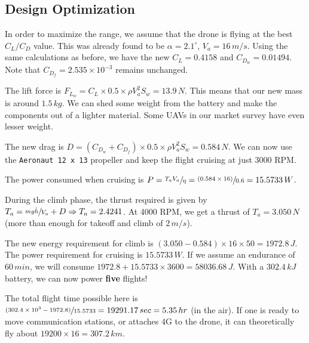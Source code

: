 \subsection{Design Optimization}

In order to maximize the range, we assume that the drone is flying at the best $C_L/C_D$ value. This was already found to be $\alpha=2.1^\circ$, $V_a = 16\,m/s$. Using the same calculations as before, we have the new $C_L = 0.4158$ and $C_{D_w} = 0.01494$. Note that $C_{D_f} = 2.535 \times 10^{-3}$ remains unchanged.

The lift force is $F_{L_w} = C_L \times 0.5 \times \rho V_a^2 S_w = 13.9\,N$. This means that our new mass is around $1.5\,kg$. We can shed some weight from the battery and make the components out of a lighter material. Some UAVs in our market survey have even lesser weight.

The new drag is $D = (C_{D_w} + C_{D_f}) \times 0.5 \times \rho V_a^2 S_w = 0.584\,N$. We can now use the \texttt{Aeronaut 12 x 13} propeller and keep the flight cruising at just $3000$ RPM. 

The power consumed when cruising is $P = \sfrac{T_a V_a}{\eta} = \sfrac{(0.584\times 16)}{0.6} = 15.5733\,W$.

During the climb phase, the thrust required is given by $T_a = \sfrac{mg \dot{h}}{V_a} + D \Rightarrow T_a = 2.4241$. At 4000 RPM, we get a thrust of $T_a = 3.050\,N$ (more than enough for takeoff and climb of $2\,m/s$).

The new energy requirement for climb is $(3.050-0.584)\times 16\times 50 = 1972.8\,J$. The power requirement for cruising is $15.5733\,W$. If we assume an endurance of $60\,min$, we will consume $1972.8+15.5733\times 3600 = 58036.68\,J$. With a $302.4\,kJ$ battery, we can now power \textbf{five} flights!

The total flight time possible here is $\sfrac{(302.4\times 10^3 - 1972.8)}{15.5733} = 19291.17\,sec = 5.35\,hr$ (in the air). If one is ready to move communication stations, or attaches 4G to the drone, it can theoretically fly about $19200\times 16 = 307.2 \, km$.

